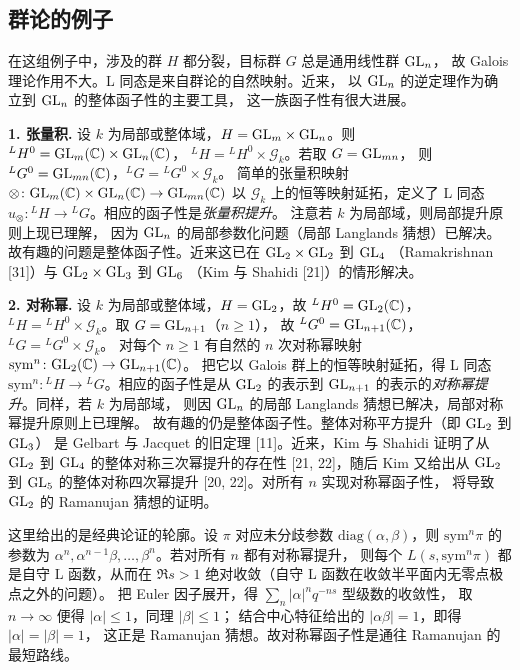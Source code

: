 \subsection{群论的例子}

在这组例子中，涉及的群 $H$ 都分裂，目标群 $G$ 总是通用线性群 $\mathrm{GL}_n$，
故 Galois 理论作用不大。L 同态是来自群论的自然映射。近来，
以 $\mathrm{GL}_n$ 的逆定理作为确立到 $\mathrm{GL}_n$ 的整体函子性的主要工具，
这一族函子性有很大进展。

\par\medskip\noindent\textbf{1. 张量积.}\quad
设 $k$ 为局部或整体域，$H=\mathrm{GL}_m\times\mathrm{GL}_n$。则
${}^{L}H^{0}=\mathrm{GL}_m(\mathbb{C})\times\mathrm{GL}_n(\mathbb{C})$，
${}^{L}H={}^{L}H^{0}\times\mathcal{G}_k$。若取 $G=\mathrm{GL}_{mn}$，
则 ${}^{L}G^{0}=\mathrm{GL}_{mn}(\mathbb{C})$，${}^{L}G={}^{L}G^{0}\times\mathcal{G}_k$。
简单的张量积映射
$\otimes\colon\mathrm{GL}_m(\mathbb{C})\times\mathrm{GL}_n(\mathbb{C})\to\mathrm{GL}_{mn}(\mathbb{C})$
以 $\mathcal{G}_k$ 上的恒等映射延拓，定义了 L 同态
$u_\otimes\colon{}^{L}H\to{}^{L}G$。相应的函子性是\emph{张量积提升}。
注意若 $k$ 为局部域，则局部提升原则上现已理解，
因为 $\mathrm{GL}_n$ 的局部参数化问题（局部 Langlands 猜想）已解决。
故有趣的问题是整体函子性。近来这已在 $\mathrm{GL}_2\times\mathrm{GL}_2$ 到 $\mathrm{GL}_4$
（Ramakrishnan [31]）与 $\mathrm{GL}_2\times\mathrm{GL}_3$ 到 $\mathrm{GL}_6$
（Kim 与 Shahidi [21]）的情形解决。

\par\medskip\noindent\textbf{2. 对称幂.}\quad
设 $k$ 为局部或整体域，$H=\mathrm{GL}_2$，故 ${}^{L}H^{0}=\mathrm{GL}_2(\mathbb{C})$，
${}^{L}H={}^{L}H^{0}\times\mathcal{G}_k$。取 $G=\mathrm{GL}_{n+1}$（$n\ge1$），
故 ${}^{L}G^{0}=\mathrm{GL}_{n+1}(\mathbb{C})$，${}^{L}G={}^{L}G^{0}\times\mathcal{G}_k$。
对每个 $n\ge1$ 有自然的 $n$ 次对称幂映射
$\mathrm{sym}^{n}\colon\mathrm{GL}_2(\mathbb{C})\to\mathrm{GL}_{n+1}(\mathbb{C})$。
把它以 Galois 群上的恒等映射延拓，得 L 同态
$\mathrm{sym}^{n}\colon{}^{L}H\to{}^{L}G$。相应的函子性是从 $\mathrm{GL}_2$
的表示到 $\mathrm{GL}_{n+1}$ 的表示的\emph{对称幂提升}。同样，若 $k$ 为局部域，
则因 $\mathrm{GL}_n$ 的局部 Langlands 猜想已解决，局部对称幂提升原则上已理解。
故有趣的仍是整体函子性。整体对称平方提升（即 $\mathrm{GL}_2$ 到 $\mathrm{GL}_3$）
是 Gelbart 与 Jacquet 的旧定理 [11]。近来，Kim 与 Shahidi 证明了从 $\mathrm{GL}_2$
到 $\mathrm{GL}_4$ 的整体对称三次幂提升的存在性 [21, 22]，随后 Kim 又给出从 $\mathrm{GL}_2$
到 $\mathrm{GL}_5$ 的整体对称四次幂提升 [20, 22]。对所有 $n$ 实现对称幂函子性，
将导致 $\mathrm{GL}_2$ 的 Ramanujan 猜想的证明。
\begin{annote}
这里给出的是经典论证的轮廓。设 $\pi$ 对应未分歧参数
$\mathrm{diag}(\alpha,\beta)$，则 $\mathrm{sym}^{n}\pi$ 的参数为
$\alpha^{n},\alpha^{n-1}\beta,\dots,\beta^{n}$。若对所有 $n$ 都有对称幂提升，
则每个 $L(s,\mathrm{sym}^{n}\pi)$ 都是自守 L 函数，从而在 $\Re s>1$
绝对收敛（自守 L 函数在收敛半平面内无零点极点之外的问题）。
把 Euler 因子展开，得 $\sum_{n}|{\alpha}|^{n}q^{-ns}$ 型级数的收敛性，
取 $n\to\infty$ 便得 $|\alpha|\le1$，同理 $|\beta|\le1$；
结合中心特征给出的 $|\alpha\beta|=1$，即得 $|\alpha|=|\beta|=1$，
这正是 Ramanujan 猜想。故对称幂函子性是通往 Ramanujan 的最短路线。
\par{}
\end{annote}

